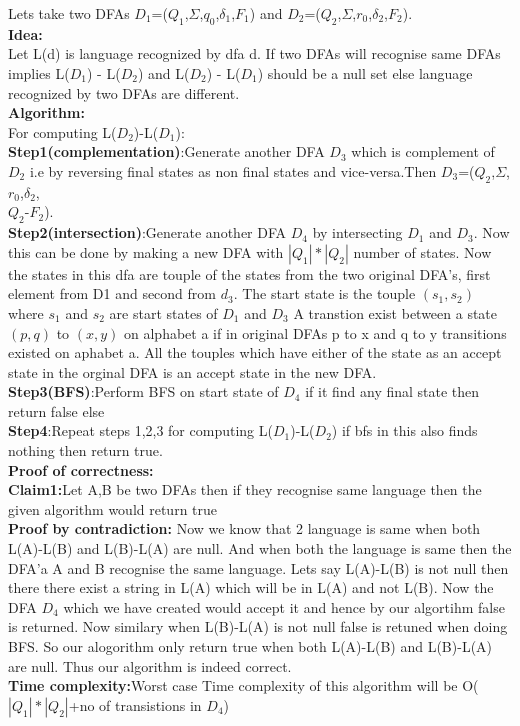 \documentclass{article}
\begin{document}
Lets take two DFAs $D_1$=($Q_1$,$\Sigma$,$q_0$,$\delta_1$,$F_1$) and $D_2$=($Q_2$,$\Sigma$,$r_0$,$\delta_2$,$F_2$).\\
\textbf{Idea:}\\
Let L(d) is language recognized by dfa d.
If two DFAs will recognise same DFAs implies L($D_1$) - L($D_2$) and L($D_2$) - L($D_1$) should be a null set else language recognized by two DFAs are different.\\
\textbf{Algorithm:}\\
For computing L($D_2$)-L($D_1$):\\
\textbf{Step1(complementation)}:Generate another DFA $D_3$ which is complement of $D_2$ i.e by reversing final states as non final states and vice-versa.Then $D_3$=($Q_2$,$\Sigma$,$r_0$,$\delta_2$,\\$Q_2$-$F_2$).\\
\textbf{Step2(intersection)}:Generate another DFA $D_4$ by intersecting $D_1$ and $D_3$. Now this can be done by making a new DFA with $|Q_1|*|Q_2|$ number of states. Now the states in this dfa are touple of the states 
from the two original DFA's, first element from D1 and second from $d_3$. The start state is the touple $(s_1,s_2)$ where $s_1$ and $s_2$ are start states of $D_1$ and $D_3$
 A transtion exist between a state $(p,q)$ to $(x,y)$ on alphabet a if in original DFAs p to x and q to y transitions existed on aphabet a. 
All the touples which have either of the state as an accept state in the orginal DFA is an accept state in the new DFA.\\
\textbf{Step3(BFS)}:Perform BFS on start state of $D_4$ if it find any final state then return false else \\
\textbf{Step4}:Repeat steps 1,2,3 for computing L($D_1$)-L($D_2$) if bfs in this also finds nothing then return true.\\
\textbf{Proof of correctness:}\\
\textbf{Claim1:}Let A,B be two DFAs then if they recognise same language then the given algorithm would return true\\
\textbf{Proof by contradiction:}
Now we know that 2 language is same when both L(A)-L(B) and L(B)-L(A) are null. And when both the language is same then the DFA'a A and B recognise the same language.
Lets say L(A)-L(B) is not null then there there exist a string in L(A) which will be in L(A) and not L(B).
Now the DFA $D_4$ which we have created would accept it and hence by our algortihm false is returned. Now similary when L(B)-L(A) is not null false is retuned when doing BFS.
So our alogorithm only return true when both L(A)-L(B) and L(B)-L(A) are null. Thus our algorithm is indeed correct.\\
\textbf{Time complexity:}Worst case Time complexity of this algorithm will be O(${|Q_1|*|Q_2|}$+no of transistions in $D_4$)
\end{document}
